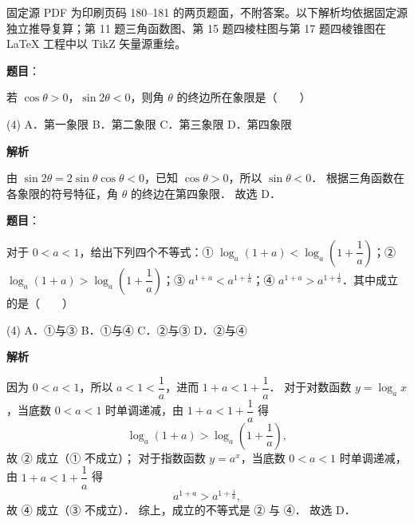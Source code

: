 

\begin{gktip}
固定源 PDF 为印刷页码 180–181 的两页题面，不附答案。以下解析均依据固定源独立推导复算；第 11 题三角函数图、第 15 题四棱柱图与第 17 题四棱锥图在 LaTeX 工程中以 TikZ 矢量源重绘。
\end{gktip}

\begin{answer}

\textbf{题目}：

若 $\cos\theta > 0$，$\sin 2\theta < 0$，则角 $\theta$ 的终边所在象限是\mbox{（　　）}

\begin{gkopts}(4)
\task A．第一象限
\task B．第二象限
\task C．第三象限
\task D．第四象限
\end{gkopts}

\textbf{解析}

由 $\sin 2\theta = 2\sin\theta\cos\theta < 0$，已知 $\cos\theta > 0$，所以 $\sin\theta < 0$．
根据三角函数在各象限的符号特征，角 $\theta$ 的终边在第四象限．
故选 D．


\end{answer}
\begin{answer}

\textbf{题目}：

对于 $0 < a < 1$，给出下列四个不等式：① $\log_a(1 + a) < \log_a\left(1 + \dfrac{1}{a}\right)$；② $\log_a(1 + a) > \log_a\left(1 + \dfrac{1}{a}\right)$；③ $a^{1+a} < a^{1+\frac{1}{a}}$；④ $a^{1+a} > a^{1+\frac{1}{a}}$．其中成立的是\mbox{（　　）}

\begin{gkopts}(4)
\task A．①与③
\task B．①与④
\task C．②与③
\task D．②与④
\end{gkopts}

\textbf{解析}

因为 $0 < a < 1$，所以 $a < 1 < \dfrac{1}{a}$，进而 $1 + a < 1 + \dfrac{1}{a}$．
对于对数函数 $y = \log_a x$，当底数 $0 < a < 1$ 时单调递减，由 $1 + a < 1 + \dfrac{1}{a}$ 得
\nopagebreak[4]
\[
\log_a(1 + a) > \log_a\left(1 + \frac{1}{a}\right),
\]
故 ② 成立（① 不成立）；
对于指数函数 $y = a^x$，当底数 $0 < a < 1$ 时单调递减，由 $1 + a < 1 + \dfrac{1}{a}$ 得
\nopagebreak[4]
\[
a^{1+a} > a^{1+\frac{1}{a}},
\]
故 ④ 成立（③ 不成立）．
综上，成立的不等式是 ② 与 ④．
故选 D．


\end{answer}

